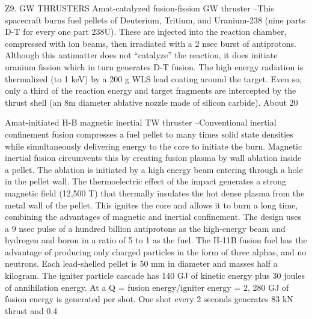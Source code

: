 \documentclass[a4paper]{book}
\begin{document}
Z9. GW THRUSTERS
Amat-catalyzed fusion-fission GW thruster –This spacecraft burns fuel pellets of Deuterium, Tritium, and Uranium-238 (nine parts D-T for every one part 238U). These are injected into the reaction chamber, compressed with ion beams, then irradiated with a 2 nsec burst of antiprotons. Although this antimatter does not “catalyze” the reaction, it does initiate uranium fission which in turn generates D-T fusion. The high energy radiation is thermalized (to 1 keV) by a 200 g WLS lead coating around the target. Even so, only a third of the reaction energy and target fragments are intercepted by the thrust shell (an 8m diameter ablative nozzle made of silicon carbide). About 20%
 
Amat-initiated H-B magnetic inertial TW thruster –Conventional inertial confinement fusion compresses a fuel pellet to many times solid state densities while simultaneously delivering energy to the core to initiate the burn. Magnetic inertial fusion circumvents this by creating fusion plasma by wall ablation inside a pellet. The ablation is initiated by a high energy beam entering through a hole in the pellet wall. The thermoelectric effect of the impact generates a strong magnetic field (12,500 T) that thermally insulates the hot dense plasma from the metal wall of the pellet. This ignites the core and allows it to burn a long time, combining the advantages of magnetic and inertial confinement. The design uses a 9 nsec pulse of a hundred billion antiprotons as the high-energy beam and hydrogen and boron in a ratio of 5 to 1 as the fuel. The H-11B fusion fuel has the advantage of producing only charged particles in the form of three alphas, and no neutrons. Each lead-shelled pellet is 50 mm in diameter and masses half a kilogram. The igniter particle cascade has 140 GJ of kinetic energy plus 30 joules of annihilation energy. At a Q = fusion energy/igniter energy = 2, 280 GJ of fusion energy is generated per shot. One shot every 2 seconds generates 83 kN thrust and 0.4%
 
\end{document}

